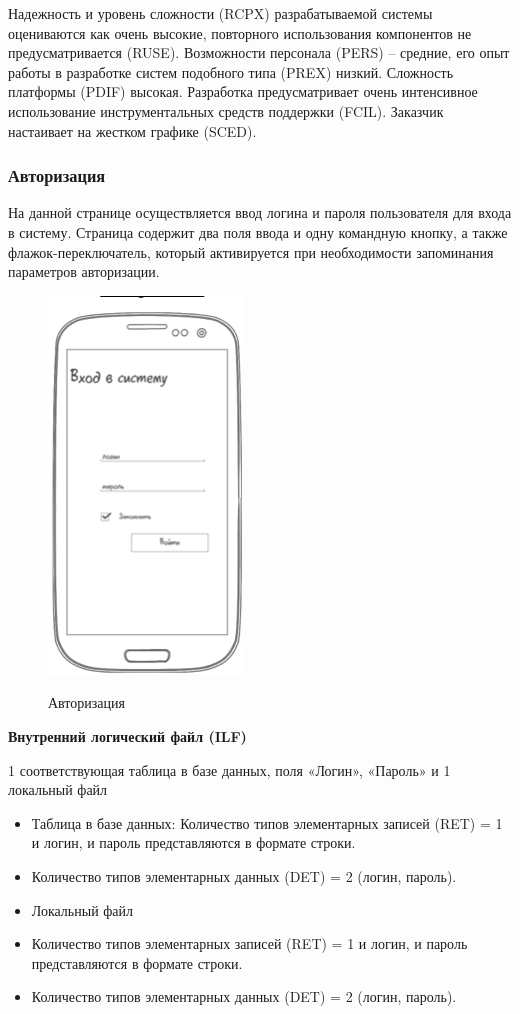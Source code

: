 Надежность и уровень сложности (RCPX) разрабатываемой системы оцениваются как очень высокие, повторного использования компонентов не предусматривается (RUSE). Возможности персонала (PERS) – средние, его опыт работы в разработке систем подобного типа (PREX) низкий. Сложность платформы (PDIF) высокая. Разработка предусматривает очень интенсивное использование инструментальных средств поддержки (FCIL). Заказчик настаивает на жестком графике (SCED).

\subsubsection{Авторизация}

На данной странице осуществляется ввод логина и пароля пользователя для входа в систему. Страница содержит два поля ввода и одну командную кнопку, а также флажок-переключатель, который активируется при необходимости запоминания параметров авторизации.

\begin{figure}[ht!]
	\includegraphics[width=0.3\linewidth]{assets/images/1.1 Авторизация.png}
	\label{fig:r2}
	\caption{Авторизация}
\end{figure}
\FloatBarrier

\textbf{Внутренний логический файл (ILF)}

1 соответствующая таблица в базе данных, поля «Логин», «Пароль» и 1 локальный файл

\begin{itemize}
	\item Таблица в базе данных: Количество типов элементарных записей (RET) = 1 и логин, и пароль представляются в формате строки.
	\item Количество типов элементарных данных (DET) = 2 (логин, пароль).
	\item Локальный файл
	\item Количество типов элементарных записей (RET) = 1 и логин, и пароль представляются в формате строки.
	\item Количество типов элементарных данных (DET) = 2 (логин, пароль).
\end{itemize}



